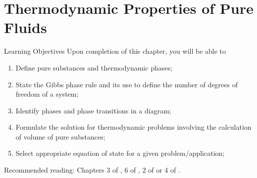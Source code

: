 \chapter{Thermodynamic Properties of Pure Fluids}\label{Chapter:ThermodynamicPropertiesPureFluids}

   \begin{LearningObjectivesBlock}{Learning Objectives}
      Upon completion of this chapter, you will be able to
        \begin{enumerate}
           \item Define pure substances and thermodynamic phases;
           \item State the Gibbs phase rule and its use to define the number of degrees of freedom of a system;
           \item Identify phases and phase transitions in a diagram;
           \item Formulate the solution for thermodynamic problems involving the calculation of volume of pure substances;
           \item Select appropriate equation of state for a given problem/application;
        \end{enumerate}
\medskip
     Recommended reading: Chapters 3 of \citet{SmithVanNess_Book}, 6 of \citet{Sandler_Book}, 2 of \citet{Borgnakke_Book} or 4 of \citet{Atkins_Book}.
   \end{LearningObjectivesBlock}


\begin{comment}
   \begin{LearningObjectivesBlock}{Learning Objectives}
      Upon completion of this chapter, you will be able to
        \begin{enumerate}
           \item {\bf Knowledge:} Define, Name, Select, State 
           \item {\bf Comprehension:} Describe, Identify, Discuss
           \item {\bf Application:} Apply, Demonstrate, Employ, Sketch
           \item {\bf Analysis:} Analyse, Compare, Calculate, Solve
           \item {\bf Synthesis:} Determine, Formulate
           \item {\bf Evaluation:} Assess, Check, Estimate, Compare, Measure, Monitor
        \end{enumerate}
\end{comment}


